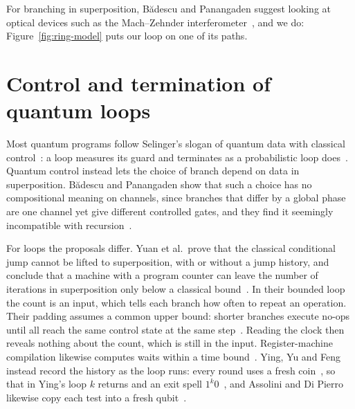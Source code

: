 \documentclass[acmsmall,screen,review,anonymous,nonacm]{acmart}
\numberwithin{equation}{section}
\begin{document}
For branching in superposition, B\u{a}descu and Panangaden suggest looking at optical devices
such as the Mach--Zehnder interferometer~\cite[\S~5]{BadescuPanangaden15}, and we do:
Figure~\ref{fig:ring-model} puts our loop on one of its paths.

\section{Control and termination of quantum loops}\label{sec:control}

Most quantum programs follow Selinger's slogan of quantum data with classical
control~\cite[\S~1]{Selinger04QPL}: a loop measures its guard and terminates as a probabilistic
loop does~\cite[Def.~3.1]{YingFeng10QuantumLoop}. Quantum control instead lets the choice of
branch depend on data in superposition. B\u{a}descu and Panangaden show that such a choice has no
compositional meaning on channels, since branches that differ by a global phase are one channel yet
give different controlled gates, and they find it seemingly incompatible with
recursion~\cite[\S\S~2, 3, 5]{BadescuPanangaden15}.

For loops the proposals differ. Yuan et al.\ prove that the classical conditional jump cannot be lifted to
superposition, with or without a jump history, and conclude that a machine with a program counter
can leave the number of iterations in superposition only below a classical
bound~\cite[\S\S~1.2, 1.3]{YuanVillanyiCarbin24QCM}. In their
bounded loop the count is an input, which tells each branch how often to repeat an operation.
Their padding assumes a common upper bound: shorter branches execute no-ops until all reach the
same control state at the same
step~\cite[\S~6.1, Fig.~7]{YuanVillanyiCarbin24QCM}. Reading the
clock then reveals nothing about the count, which is still in the input. Register-machine
compilation likewise computes waits within a time bound~\cite[\S~5]{ZhangYing25QRM}. Ying, Yu and Feng instead
record the history as the loop runs: every round uses a fresh
coin~\cite[\S~6]{YingYuFeng12Control}, so that in Ying's loop $k$ returns and an exit spell
$1^k0$~\cite[Eq.~(34)]{Ying14QuantumRecursion}, and Assolini and Di Pierro likewise copy each
test into a fresh qubit~\cite[\S~4]{AssoliniDiPierro25Loops}.
\end{document}
